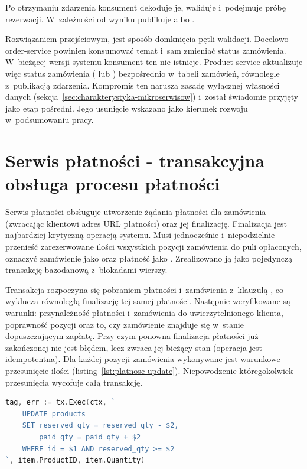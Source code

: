 Po otrzymaniu zdarzenia  konsument dekoduje je, waliduje i~podejmuje próbę rezerwacji.
W~zależności od wyniku publikuje  albo .

Rozwiązaniem przejściowym, jest sposób domknięcia pętli walidacji. Docelowo order-service powinien 
konsumować temat  i~sam zmieniać status zamówienia. W~bieżącej
wersji systemu konsument ten nie istnieje. Product-service aktualizuje więc status zamówienia
( lub ) bezpośrednio w~tabeli zamówień, równolegle z~publikacją zdarzenia.
Kompromis ten narusza zasadę wyłącznej własności danych (sekcja~\ref{sec:charakterystyka-mikroserwisow})
i~został świadomie przyjęty jako etap pośredni. Jego usunięcie wskazano jako kierunek rozwoju
w~podsumowaniu pracy.

\section{Serwis płatności - transakcyjna obsługa procesu płatności}
\label{sec:payment-service}

Serwis płatności obsługuje utworzenie żądania płatności dla zamówienia (zwracając klientowi adres URL płatności)
oraz jej finalizację. Finalizacja jest najbardziej krytyczną operacją systemu. Musi jednocześnie i~niepodzielnie
przenieść zarezerwowane ilości wszystkich pozycji zamówienia do puli opłaconych, oznaczyć zamówienie jako
 oraz płatność jako . Zrealizowano ją jako pojedynczą transakcję bazodanową
z~blokadami wierszy.

Transakcja rozpoczyna się pobraniem płatności i~zamówienia z~klauzulą , co wyklucza równoległą
finalizację tej samej płatności. Następnie weryfikowane są warunki: przynależność płatności i~zamówienia do
uwierzytelnionego klienta, poprawność pozycji oraz to, czy zamówienie znajduje się w~stanie dopuszczającym
zapłatę. Przy czym ponowna finalizacja płatności już zakończonej nie jest błędem, lecz zwraca jej bieżący stan
(operacja jest idempotentna). Dla każdej pozycji zamówienia wykonywane jest warunkowe przesunięcie ilości
(listing~\ref{lst:platnosc-update}). Niepowodzenie któregokolwiek przesunięcia wycofuje całą transakcję.

\begin{lstlisting}[caption={Warunkowe przesunięcie ilości w transakcji płatności},label={lst:platnosc-update},language=Go]
tag, err := tx.Exec(ctx, `
    UPDATE products
    SET reserved_qty = reserved_qty - $2,
        paid_qty = paid_qty + $2
    WHERE id = $1 AND reserved_qty >= $2
`, item.ProductID, item.Quantity)
\end{lstlisting}

